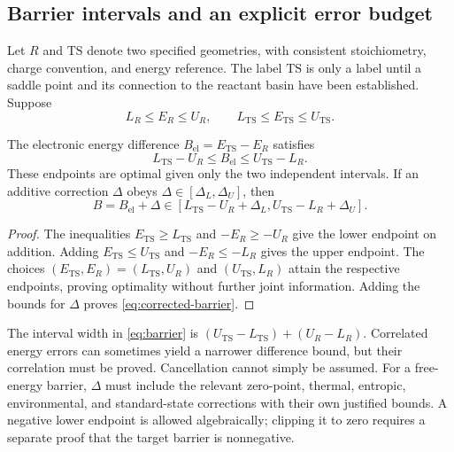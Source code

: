 \subsection{Barrier intervals and an explicit error budget}
Let $R$ and $\mathrm{TS}$ denote two specified geometries, with consistent
stoichiometry, charge convention, and energy reference. The label
$\mathrm{TS}$ is only a label until a saddle point and its connection to the
reactant basin have been established. Suppose
\[
 L_R\le E_R\le U_R,\qquad
 L_{\mathrm{TS}}\le E_{\mathrm{TS}}\le U_{\mathrm{TS}}.
\]

\begin{proposition}
\label{prop:barrier}
The electronic energy difference $B_{\mathrm{el}}=E_{\mathrm{TS}}-E_R$
satisfies
\begin{equation}
 L_{\mathrm{TS}}-U_R\le B_{\mathrm{el}}
 \le U_{\mathrm{TS}}-L_R.
 \label{eq:barrier}
\end{equation}
These endpoints are optimal given only the two independent intervals.
If an additive correction $\Delta$ obeys
$\Delta\in[\Delta_L,\Delta_U]$, then
\begin{equation}
 B=B_{\mathrm{el}}+\Delta\in
 [L_{\mathrm{TS}}-U_R+\Delta_L,
  U_{\mathrm{TS}}-L_R+\Delta_U].
 \label{eq:corrected-barrier}
\end{equation}
\end{proposition}
\begin{proof}
The inequalities $E_{\mathrm{TS}}\ge L_{\mathrm{TS}}$ and
$-E_R\ge-U_R$ give the lower endpoint on addition. Adding
$E_{\mathrm{TS}}\le U_{\mathrm{TS}}$ and $-E_R\le-L_R$ gives the
upper endpoint. The choices $(E_{\mathrm{TS}},E_R)=
(L_{\mathrm{TS}},U_R)$ and $(U_{\mathrm{TS}},L_R)$ attain the respective
endpoints, proving optimality without further joint information. Adding the
bounds for $\Delta$ proves \eqref{eq:corrected-barrier}.
\end{proof}

The interval width in \eqref{eq:barrier} is
$(U_{\mathrm{TS}}-L_{\mathrm{TS}})+(U_R-L_R)$.
Correlated energy errors can sometimes yield a narrower difference bound,
but their correlation must be proved. Cancellation cannot simply be assumed.
For a free-energy barrier, $\Delta$ must include the relevant zero-point,
thermal, entropic, environmental, and standard-state corrections with their
own justified bounds. A negative lower endpoint is allowed algebraically;
clipping it to zero requires a separate proof that the target barrier is
nonnegative.


